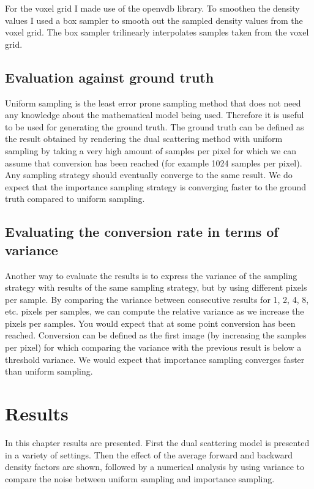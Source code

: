 \documentclass[11pt,a4paper]{report}
\begin{document}
For the voxel grid I made use of the openvdb library. To smoothen the density values I used a box sampler to smooth out the sampled density values from the voxel grid. The box sampler trilinearly interpolates samples taken from the voxel grid.

\section{Evaluation against ground truth}

Uniform sampling is the least error prone sampling method that does not need any knowledge about the mathematical model being used. Therefore it is useful to be used for generating the ground truth. The ground truth can be defined as the result obtained by rendering the dual scattering method with uniform sampling by taking a very high amount of samples per pixel for which we can assume that conversion has been reached (for example 1024 samples per pixel).  Any sampling strategy should eventually converge to the same result. We do expect that the importance sampling strategy is converging faster to the ground truth compared to uniform sampling.


\section{Evaluating the conversion rate in terms of variance}

Another way to evaluate the results is to express the variance of the sampling strategy with results of the same sampling strategy, but by using different pixels per sample. By comparing the variance between consecutive results for 1, 2, 4, 8, etc. pixels per samples, we can compute the relative variance as we increase the pixels per samples. You would expect that at some point conversion has been reached. Conversion can be defined as the first image (by increasing the samples per pixel) for which comparing the variance with the previous result is below a threshold variance. We would expect that importance sampling converges faster than uniform sampling.


\chapter{Results}

In this chapter results are presented. First the dual scattering model is presented in a variety of settings. Then the effect of the average forward and backward density factors are shown, followed by a numerical analysis by using variance to compare the noise between uniform sampling and importance sampling.
\end{document}
